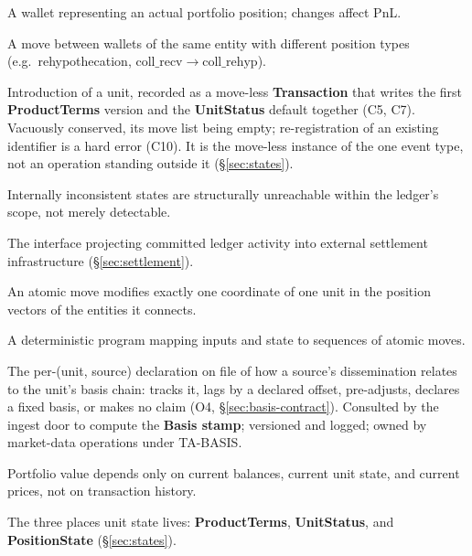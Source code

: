 \documentclass[11pt,a4paper]{article}
\begin{document}
\begin{description}[style=nextline]
\item[Real wallet] A wallet representing an actual portfolio position; changes affect PnL.

\item[Reclassification] A move between wallets of the same entity with different position types (e.g.\ rehypothecation, $\mathrm{coll\_recv}\to\mathrm{coll\_rehyp}$).

\item[Registration] Introduction of a unit, recorded as a move-less \textbf{Transaction} that writes the first \textbf{ProductTerms} version and the \textbf{UnitStatus} default together (C5, C7). Vacuously conserved, its move list being empty; re-registration of an existing identifier is a hard error (C10). It is the move-less instance of the one event type, not an operation standing outside it (\S\ref{sec:states}).

\item[Self-consistency] Internally inconsistent states are structurally unreachable within the ledger's scope, not merely detectable.

\item[Settlement layer] The interface projecting committed ledger activity into external settlement infrastructure (\S\ref{sec:settlement}).

\item[Single-Coordinate Move Principle] An atomic move modifies exactly one coordinate of one unit in the position vectors of the entities it connects.

\item[Smart contract] A deterministic program mapping inputs and state to sequences of atomic moves.

\item[Source basis convention] The per-(unit, source) declaration on file of how a source's dissemination relates to the unit's basis chain: tracks it, lags by a declared offset, pre-adjusts, declares a fixed basis, or makes no claim (O4, \S\ref{sec:basis-contract}). Consulted by the ingest door to compute the \textbf{Basis stamp}; versioned and logged; owned by market-data operations under TA-BASIS.

\item[State-sufficiency] Portfolio value depends only on current balances, current unit state, and current prices, not on transaction history.

\item[Three homes] The three places unit state lives: \textbf{ProductTerms}, \textbf{UnitStatus}, and \textbf{PositionState} (\S\ref{sec:states}).


\end{description}
\end{document}
